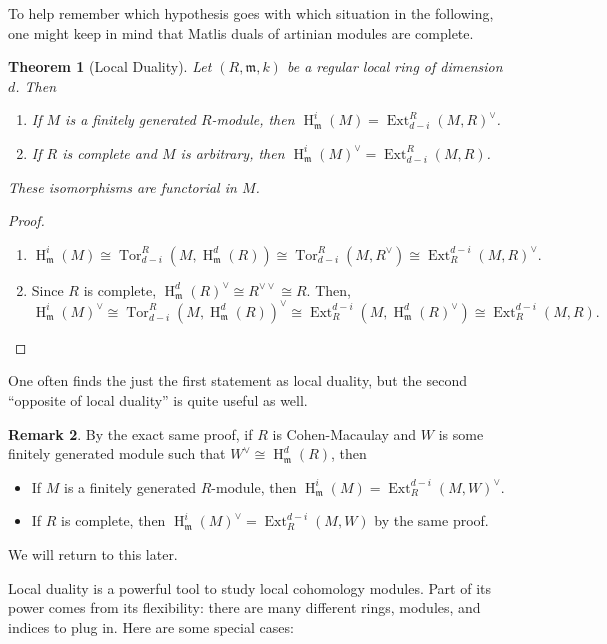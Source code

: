 \documentclass[11pt]{book}
\newtheorem{theorem}{Theorem}[chapter]
\numberwithin{equation}{section}
\numberwithin{theorem}{chapter}
\theoremstyle{definition}
\newtheorem*{basic properties}{Basic Properties}
\newtheorem*{Important Remark}{Important Remark}
\newtheorem{remark}[theorem]{Remark}
\theoremstyle{remark}
\newcommand{\m}{\mathfrak{m}}
\newcommand{\Ext}{\operatorname{Ext}}
\newcommand{\Tor}{\operatorname{Tor}}
\renewcommand{\H}{\operatorname{H}}
\begin{document}
To help remember which hypothesis goes with which situation in the following, one might keep in mind that Matlis duals of artinian modules are complete.

\begin{theorem}[Local Duality]
	Let $(R,\m,k)$ be a regular local ring of dimension $d$. Then
	\begin{enumerate}[1)]
		\item If $M$ is a finitely generated $R$-module, then $\H^i_\m(M) = \Ext^R_{d-i}(M,R)^{\vee}$.
		\item If $R$ is complete and $M$ is arbitrary, then $\H^i_\m(M)^{\vee} = \Ext^R_{d-i}(M,R)$.
	\end{enumerate}
These isomorphisms are functorial in $M$.
\end{theorem}

\begin{proof}
	\begin{enumerate}
	\item	\[
			\H^i_\m(M)  \cong \Tor^R_{d-i}(M,\H^d_\m(R)) \cong
			 \Tor^R_{d-i}(M,R^{\vee}) \cong
			 \Ext_R^{d-i}(M,R)^{\vee}.
	\]
	\item Since $R$ is complete, $\H^d_{\m}(R)^\vee\cong R^{\vee\vee}\cong R$. Then,
	\[
			\H^i_\m(M)^\vee  \cong \Tor^R_{d-i}(M,\H^d_\m(R))^{\vee} \cong
			 \Ext_R^{d-i}(M,\H^d_\m(R)^{\vee}) \cong
			 \Ext_R^{d-i}(M,R).
	\]\qedhere
	\end{enumerate}
\end{proof}

One often finds the just the first statement as local duality, but the second ``opposite of local duality'' is quite useful as well.

\begin{remark}\label{Generalizing-local-duality}
	By the exact same proof, if $R$ is Cohen-Macaulay and $W$ is some finitely generated module such that $W^\vee \cong \H^d_\m(R)$, then
	\begin{itemize}
		\item If $M$ is a finitely generated $R$-module, then $\H^i_\m(M) = \Ext_R^{d-i}(M,W)^\vee$.
		\item If $R$ is complete, then $\H^i_\m(M)^{\vee} = \Ext_R^{d-i}(M,W)$ by the same proof.
	\end{itemize}
We will return to this later.
\end{remark}

Local duality is a powerful tool to study local cohomology modules. Part of its power comes from its flexibility: there are many different rings, modules, and indices to plug in. Here are some special cases:
\end{document}
